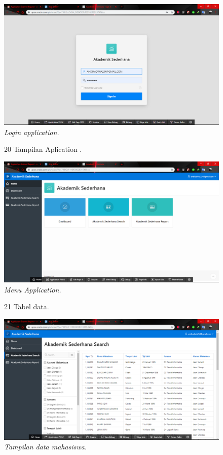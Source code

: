 \begin{enumerate}
\begin{figure}
    \begin{center}
\includegraphics[scale=0.2]{figures/01.png}
    \caption{\textit{Login application.}}
        \end{center}
\label{gambar}
\end{figure}

\begin{figure}
\item[20]Tampilan Aplication .

    \begin{center}
\includegraphics[scale=0.2]{figures/02.png}
    \caption{\textit{Menu Application.}}
        \end{center}
\label{gambar}
\end{figure}

\begin{figure}
\item[21]Tabel data.
    \begin{center}
\includegraphics[scale=0.2]{figures/03.png} 
    \caption{\textit{Tampilan data mahasiswa.}}
        \end{center}
\label{gambar}
\end{figure}
\end{enumerate}
